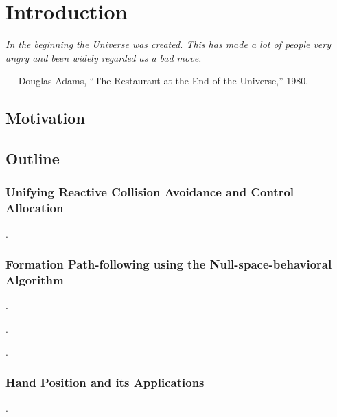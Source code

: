 \chapter{Introduction}
\label{chap:introduction}

\setlength{\epigraphwidth}{0.5\textwidth}
\epigraph{ \it
    In the beginning the Universe was created.
    This has made a lot of people very angry and been widely regarded as a bad move.
}{--- Douglas Adams, ``The Restaurant at the End of the Universe,'' 1980.}

\section{Motivation}



\section{Outline}

\subsection{Unifying Reactive Collision Avoidance and Control Allocation}
.

\subsection{Formation Path-following using the Null-space-behavioral Algorithm}
.

\noindent{}.

\noindent{}.

\subsection{Hand Position and its Applications}
.

\noindent{}

\noindent{}

\noindent{}

\noindent{}
